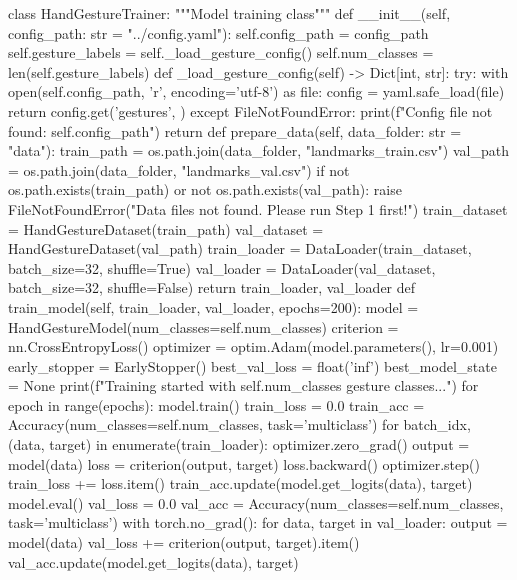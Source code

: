 \begin{aivncodebox}
\begin{python}
class HandGestureTrainer:
    """Model training class"""
    def __init__(self, config_path: str = "../config.yaml"):
        self.config_path = config_path
        self.gesture_labels = self._load_gesture_config()
        self.num_classes = len(self.gesture_labels)
    def _load_gesture_config(self) -> Dict[int, str]:
        try:
            with open(self.config_path, 'r', encoding='utf-8') as file:
                config = yaml.safe_load(file)
                return config.get('gestures', {})
        except FileNotFoundError:
            print(f"Config file not found: {self.config_path}")
            return {}
    def prepare_data(self, data_folder: str = "data"):
        train_path = os.path.join(data_folder, "landmarks_train.csv")
        val_path = os.path.join(data_folder, "landmarks_val.csv")
        if not os.path.exists(train_path) or not os.path.exists(val_path):
            raise FileNotFoundError("Data files not found. Please run Step 1 first!")
        train_dataset = HandGestureDataset(train_path)
        val_dataset = HandGestureDataset(val_path)
        train_loader = DataLoader(train_dataset, batch_size=32, shuffle=True)
        val_loader = DataLoader(val_dataset, batch_size=32, shuffle=False)
        return train_loader, val_loader
    def train_model(self, train_loader, val_loader, epochs=200):
        model = HandGestureModel(num_classes=self.num_classes)
        criterion = nn.CrossEntropyLoss()
        optimizer = optim.Adam(model.parameters(), lr=0.001)
        early_stopper = EarlyStopper()
        best_val_loss = float('inf')
        best_model_state = None
        print(f"Training started with {self.num_classes} gesture classes...")
        for epoch in range(epochs):
            model.train()
            train_loss = 0.0
            train_acc = Accuracy(num_classes=self.num_classes, task='multiclass')
            for batch_idx, (data, target) in enumerate(train_loader):
                optimizer.zero_grad()
                output = model(data)
                loss = criterion(output, target)
                loss.backward()
                optimizer.step()
                train_loss += loss.item()
                train_acc.update(model.get_logits(data), target)
            model.eval()
            val_loss = 0.0
            val_acc = Accuracy(num_classes=self.num_classes, task='multiclass')
            with torch.no_grad():
                for data, target in val_loader:
                    output = model(data)
                    val_loss += criterion(output, target).item()
                    val_acc.update(model.get_logits(data), target)

\end{python}
\end{aivncodebox}
